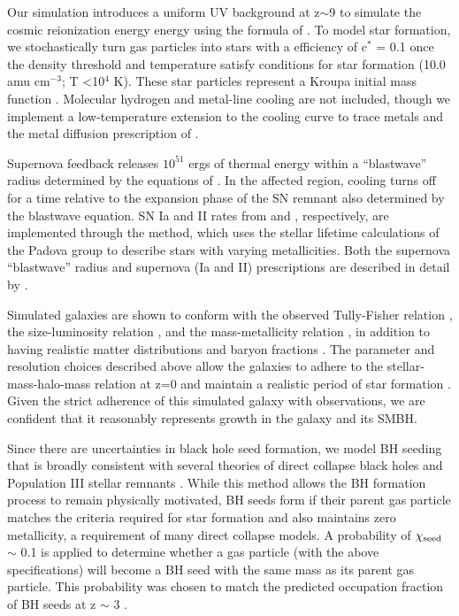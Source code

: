 \documentclass[]{emulateapj}
\begin{document}
Our simulation introduces a uniform UV background at z$\sim$9 to simulate the cosmic reionization energy energy using the formula of \cite{Haardt2012}. To model star formation, we stochastically turn gas particles into stars with a efficiency of c$^*$ = 0.1 once the density threshold and temperature satisfy conditions for star formation (10.0 amu cm$^{-3}$; T \textless 10$^4$ K). These star particles represent a Kroupa initial mass function \citep{Kroupa1993}. Molecular hydrogen and metal-line cooling are not included, though we implement a low-temperature extension to the cooling curve to trace metals \citep{Bromm2001} and the metal diffusion prescription of \cite{Shen2010}. 

Supernova feedback releases $10^{51}$ ergs of thermal energy within a ``blastwave'' radius determined by the equations of \cite{Ostriker1988}. In the affected region, cooling turns off for a time relative to the expansion phase of the SN remnant also determined by the blastwave equation. SN Ia and II rates from \cite{Thielemann1986} and \cite{Woosley1995}, respectively, are implemented through the \cite{Raiteri1996} method, which uses the stellar lifetime calculations of the Padova group \citep{Alongi1993, Bressan1993, Bertelli1994} to describe stars with varying metallicities. Both the supernova ``blastwave'' radius and supernova (Ia and II) prescriptions are described in detail by \cite{Stinson2006}. 

Simulated galaxies are shown to conform with the observed Tully-Fisher relation \citep{Governato2009}, the size-luminosity relation \citep{Brooks2011}, and the mass-metallicity relation \citep{Brooks2007,Christensen2015}, in addition to having realistic matter distributions and baryon fractions \citep{Governato2009a,Guedes2011}. The parameter and resolution choices described above allow the galaxies to adhere to the stellar-mass-halo-mass relation at z=0 and maintain a realistic period of star formation \citep{Moster2010,Munshi2013,Brooks2007,Maiolino2008}. Given the strict adherence of this simulated galaxy with observations, we are confident that it reasonably represents growth in the galaxy and its SMBH.
 
Since there are uncertainties in black hole seed formation, we model BH seeding that is broadly consistent with several theories of direct collapse black holes \citep{Couchman1986, Abel2002, Bromm2004} and Population III stellar remnants \citep{Loeb1994, Eisenstein1995, Koushiappas2004, Begelman2006, Lodato2006}. While this method allows the BH formation process to remain physically motivated, BH seeds form if their parent gas particle matches the criteria required for star formation and also maintains zero metallicity, a requirement of many direct collapse models. A probability of $\chi_{\rm seed}$ $\sim$ 0.1 is applied to determine whether a gas particle (with the above specifications) will become a BH seed with the same mass as its parent gas particle. This probability was chosen to match the predicted occupation fraction of BH seeds at z $\sim$ 3 \citep{Volonteri2008}.
\end{document}
